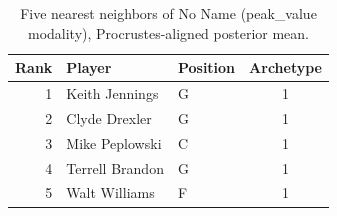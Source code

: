 \begin{table}[htbp]
  \centering\small
  \begin{tabular}{rllc}
    \toprule
    Rank & Player & Position & Archetype \\
    \midrule
    1 & Keith Jennings & G & 1 \\
    2 & Clyde Drexler & G & 1 \\
    3 & Mike Peplowski & C & 1 \\
    4 & Terrell Brandon & G & 1 \\
    5 & Walt Williams & F & 1 \\
    \bottomrule
  \end{tabular}
  \caption{Five nearest neighbors of No Name (peak_value modality), Procrustes-aligned posterior mean.}
  \label{tab:No_Name_neighbors_peak_value}
\end{table}


